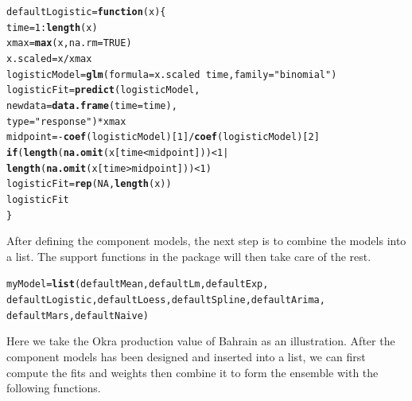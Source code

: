 \documentclass[nojss]{jss}\usepackage[]{graphicx}\usepackage[]{color}
\makeatletter
\newcommand{\hlnum}[1]{\textcolor[rgb]{0.686,0.059,0.569}{#1}}%
\newcommand{\hlstr}[1]{\textcolor[rgb]{0.192,0.494,0.8}{#1}}%
\newcommand{\hlopt}[1]{\textcolor[rgb]{0,0,0}{#1}}%
\newcommand{\hlstd}[1]{\textcolor[rgb]{0.345,0.345,0.345}{#1}}%
\newcommand{\hlkwa}[1]{\textcolor[rgb]{0.161,0.373,0.58}{\textbf{#1}}}%
\newcommand{\hlkwb}[1]{\textcolor[rgb]{0.69,0.353,0.396}{#1}}%
\newcommand{\hlkwc}[1]{\textcolor[rgb]{0.333,0.667,0.333}{#1}}%
\newcommand{\hlkwd}[1]{\textcolor[rgb]{0.737,0.353,0.396}{\textbf{#1}}}%
\newenvironment{kframe}{%
 \def\at@end@of@kframe{}%
 \ifinner\ifhmode%
  \def\at@end@of@kframe{\end{minipage}}%
  \begin{minipage}{\columnwidth}%
 \fi\fi%
 \def\FrameCommand##1{\hskip\@totalleftmargin \hskip-\fboxsep
 \colorbox{shadecolor}{##1}\hskip-\fboxsep
     \hskip-\linewidth \hskip-\@totalleftmargin \hskip\columnwidth}%
 \MakeFramed {\advance\hsize-\width
   \@totalleftmargin\z@ \linewidth\hsize
   \@setminipage}}%
 {\par\unskip\endMakeFramed%
 \at@end@of@kframe}
\newenvironment{knitrout}{}{} %
\makeatother
\begin{document}
\begin{knitrout}
\color{fgcolor}\begin{kframe}
\begin{alltt}
\hlstd{defaultLogistic} \hlkwb{=} \hlkwa{function} \hlstd{(}\hlkwc{x}\hlstd{)\{}
    \hlstd{time} \hlkwb{=} \hlnum{1}\hlopt{:}\hlkwd{length}\hlstd{(x)}
    \hlstd{xmax} \hlkwb{=} \hlkwd{max}\hlstd{(x,} \hlkwc{na.rm} \hlstd{=} \hlnum{TRUE}\hlstd{)}
    \hlstd{x.scaled} \hlkwb{=} \hlstd{x}\hlopt{/}\hlstd{xmax}
    \hlstd{logisticModel} \hlkwb{=} \hlkwd{glm}\hlstd{(}\hlkwc{formula} \hlstd{= x.scaled} \hlopt{~} \hlstd{time,} \hlkwc{family} \hlstd{=} \hlstr{"binomial"}\hlstd{)}
    \hlstd{logisticFit} \hlkwb{=} \hlkwd{predict}\hlstd{(logisticModel,}
                          \hlkwc{newdata} \hlstd{=} \hlkwd{data.frame}\hlstd{(}\hlkwc{time} \hlstd{= time),}
                          \hlkwc{type} \hlstd{=} \hlstr{"response"}\hlstd{)} \hlopt{*} \hlstd{xmax}
    \hlstd{midpoint} \hlkwb{=} \hlopt{-}\hlkwd{coef}\hlstd{(logisticModel)[}\hlnum{1}\hlstd{]}\hlopt{/}\hlkwd{coef}\hlstd{(logisticModel)[}\hlnum{2}\hlstd{]}
    \hlkwa{if} \hlstd{(}\hlkwd{length}\hlstd{(}\hlkwd{na.omit}\hlstd{(x[time} \hlopt{<} \hlstd{midpoint]))} \hlopt{<} \hlnum{1} \hlopt{|}
        \hlkwd{length}\hlstd{(}\hlkwd{na.omit}\hlstd{(x[time} \hlopt{>} \hlstd{midpoint]))} \hlopt{<} \hlnum{1}\hlstd{)}
        \hlstd{logisticFit} \hlkwb{=} \hlkwd{rep}\hlstd{(}\hlnum{NA}\hlstd{,} \hlkwd{length}\hlstd{(x))}
    \hlstd{logisticFit}
\hlstd{\}}
\end{alltt}
\end{kframe}
\end{knitrout}

After defining the component models, the next step is to combine the
models into a list. The support functions in the package will then
take care of the rest.

\begin{knitrout}
\color{fgcolor}\begin{kframe}
\begin{alltt}
\hlstd{myModel} \hlkwb{=} \hlkwd{list}\hlstd{(defaultMean, defaultLm, defaultExp,}
        \hlstd{defaultLogistic, defaultLoess, defaultSpline, defaultArima,}
        \hlstd{defaultMars, defaultNaive)}
\end{alltt}
\end{kframe}
\end{knitrout}

Here we take the Okra production value of Bahrain as an
illustration. After the component models has been designed and
inserted into a list, we can first compute the fits and weights then
combine it to form the ensemble with the following functions.
\end{document}
